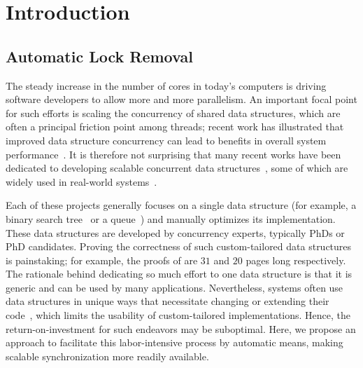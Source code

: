 
\section{Introduction} \label{sec:intro}

\subsection{Automatic Lock Removal}
The steady increase in the number of cores in today's computers is driving software developers to allow more and more parallelism.
An important focal point for such efforts is scaling the concurrency of shared data structures, which are often a principal friction point among threads; recent work has illustrated that improved data structure concurrency can lead to  
benefits in overall system performance~\cite{clsm-poster}.  
It is therefore not surprising that many recent works have been dedicated to developing scalable concurrent data structures~\cite{ArbelA2014,DrachslerVY2014,NatarajanM2014,BrownER2014,CrainGR2013,BraginskyP2012,
AfekKKMT2012,EllenFRB2010,BronsonCCO2010,HerlihyLLS2007,Michael:1996}, 
some of which are widely used in real-world systems~\cite{xxx}.

Each of these projects generally focuses on a single data
structure (for example, a binary search tree~\cite{ArbelA2014} or a queue~\cite{Michael:1996}) and manually optimizes its implementation. These data structures are developed by concurrency experts, typically PhDs or PhD candidates. 
Proving the correctness of such custom-tailored data structures is painstaking; 
for example, the proofs of \cite{BraginskyP2012,EllenFRB2010} are $31$ and $20$ pages long
respectively. 
The rationale behind dedicating so much effort to one data structure is that it is  
generic and can be used by many applications. Nevertheless,  systems often use data structures in unique ways 
that necessitate changing or extending their code~\cite{levelDB,xxx}, which limits the usability of custom-tailored
implementations. Hence, the return-on-investment for such endeavors may be suboptimal. 
Here, we propose an approach to facilitate this labor-intensive process by automatic means,
making scalable synchronization more readily available. 

